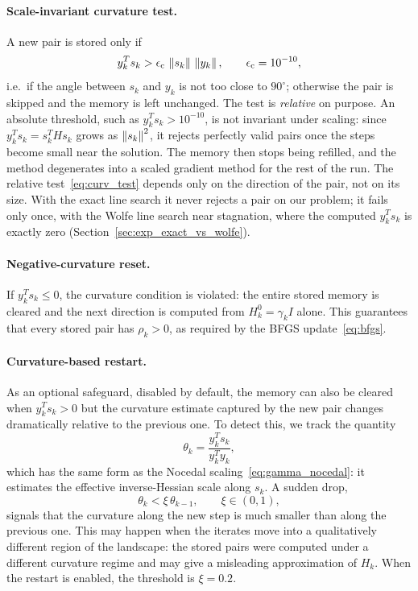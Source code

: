 \paragraph{Scale-invariant curvature test.}
A new pair is stored only if
\begin{equation}
\label{eq:curv_test}
    y_k^T s_k > \epsilon_{\mathrm{c}}\, \left\|s_k\right\|\,\left\|y_k\right\|,
    \qquad \epsilon_{\mathrm{c}} = 10^{-10},
\end{equation}
i.e.\ if the angle between $s_k$ and $y_k$ is not too close to $90^\circ$;
otherwise the pair is skipped and the memory is left unchanged. The test is
\emph{relative} on purpose. An absolute threshold, such as
$y_k^T s_k > 10^{-10}$, is not invariant under scaling: since
$y_k^T s_k = s_k^T H s_k$ grows as $\left\|s_k\right\|^2$, it rejects perfectly valid
pairs once the steps become small near the solution. The memory then stops
being refilled, and the method degenerates into a scaled gradient method for
the rest of the run. The relative test~\eqref{eq:curv_test} depends only on
the direction of the pair, not on its size. With the exact line search it
never rejects a pair on our problem; it fails only once, with the Wolfe line
search near stagnation, where the computed $y_k^T s_k$ is exactly zero
(Section~\ref{sec:exp_exact_vs_wolfe}).

\paragraph{Negative-curvature reset.}
If $y_k^T s_k \leq 0$, the curvature condition is violated: the entire stored
memory is cleared and the next direction is computed from
$H_k^0 = \gamma_k I$ alone. This guarantees that every stored pair has
$\rho_k > 0$, as required by the BFGS update~\eqref{eq:bfgs}.

\paragraph{Curvature-based restart.}
As an optional safeguard, disabled by default, the memory can also be cleared
when $y_k^T s_k > 0$ but the curvature estimate captured by the new pair
changes dramatically relative to the previous one. To detect this, we track
the quantity
\begin{equation}
\label{eq:gamma_restart}
    \theta_k = \frac{y_k^T s_k}{y_k^T y_k},
\end{equation}
which has the same form as the Nocedal scaling~\eqref{eq:gamma_nocedal}: it
estimates the effective inverse-Hessian scale along $s_k$. A sudden drop,
\begin{equation}
\label{eq:restart_cond}
    \theta_k < \xi\, \theta_{k-1}, \qquad \xi \in (0,1),
\end{equation}
signals that the curvature along the new step is much smaller than along the
previous one. This may happen when the iterates move into a qualitatively
different region of the landscape: the stored pairs were computed under a
different curvature regime and may give a misleading approximation of $H_k$.
When the restart is enabled, the threshold is $\xi = 0.2$.

